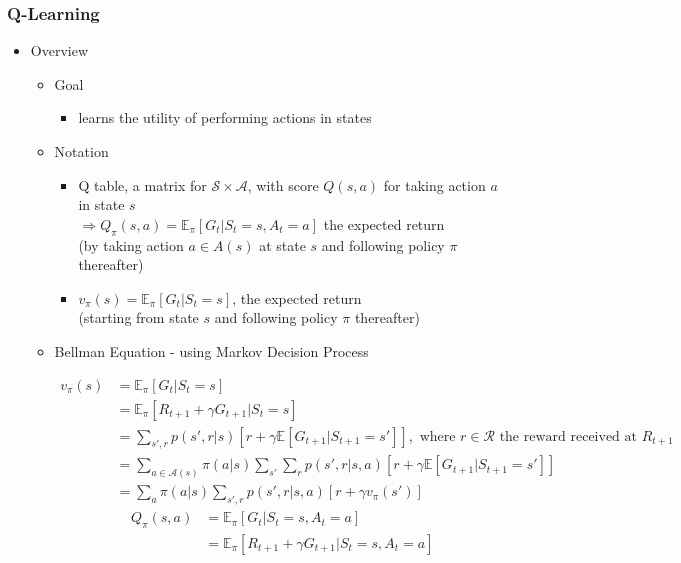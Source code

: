 \subsubsection{Q-Learning}
\begin{itemize}
\item Overview
	\begin{itemize}
	\item Goal
		\begin{itemize}
		\item learns the utility of performing actions in states
		\end{itemize}
	\item Notation
		\begin{itemize}
		\item Q table, a matrix for $\mathcal S\times  \mathcal A$, with score $Q(s,a)$ for taking action $a$ in state $s$ \\
		$\Rightarrow Q_\pi (s,a) = { \mathbb E }_\pi [G_t|S_t=s, A_t=a]$ the expected return \\ 
		(by taking action $a\in A(s)$ at state $s$ and following policy $\pi$ thereafter)
		\item $v_\pi(s) = {\mathbb E}_\pi [G_t|S_t=s]$, the expected return \\
		(starting from state $s$ and following policy $\pi$ thereafter)
		\end{itemize}
	\item Bellman Equation - using Markov Decision Process
		\begin{itemize}
		\Item \begin{align*} \displaystyle v_\pi(s) &= {\mathbb E}_\pi [G_t|S_t=s] \\
		&= {\mathbb E}_\pi \left[R_{t+1} + \gamma G_{t+1} \bigg|S_t=s \right] \\
		&= \sum_{s',r} p(s',r|s) \left[ r + \gamma \mathbb E\left[ G_{t+1} \big| S_{t+1} = s' \right] \right], \text{ where } r\in \mathcal R \text{ the reward received at } R_{t+1} \\
		&= \sum_{a\in \mathcal A(s)} \pi(a|s) \sum_{s'}\sum_r p(s',r|s,a) \left[ r + \gamma \mathbb E\left[ G_{t+1} \big| S_{t+1} = s' \right] \right] \\
		&= \sum_a \pi(a|s) \sum_{s',r} p(s', r|s,a) [r + \gamma v_\pi(s')] \end{align*}
		\Item \begin{align*} \displaystyle Q_\pi(s,a) &= {\mathbb E}_\pi [G_t | S_t=s,A_t=a] \\
		&= \displaystyle {\mathbb E}_\pi \left[R_{t+1} + \gamma G_{t+1} \bigg|S_t=s, A_t=a \right]  \\

\end{align*}
\end{itemize}
\end{itemize}
\end{itemize}
